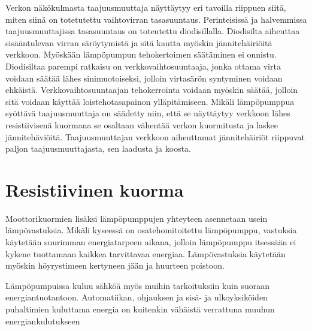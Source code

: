   Verkon näkökulmasta taajuusmuuttaja näyttäytyy eri tavoilla riippuen siitä, miten siinä on totetutettu vaihtovirran tasasuuntaus. Perinteisissä ja halvemmissa taajuusmuuttajissa tasasuuntaus on toteutettu diodisillalla. Diodisilta aiheuttaa sisääntulevan virran säröytymistä ja sitä kautta myöskin jännitehäiriöitä verkkoon. Myöskään lämpöpumpun tehokertoimen säätäminen ei onnistu. Diodisiltaa parempi ratkaisu on verkkovaihtosuuntaaja, jonka ottama virta voidaan säätää lähes sinimuotoiseksi, jolloin virtasärön syntyminen voidaan ehkäistä. Verkkovaihtosuuntaajan tehokerrointa voidaan myöskin säätää, jolloin sitä voidaan käyttää loistehotasapainon ylläpitämiseen. Mikäli lämpöpumppua syöttävä taajuusmuuttaja on säädetty niin, että se näyttäytyy verkkoon lähes resistiivisenä kuormana se osaltaan vähentää verkon kuormitusta ja laskee jännitehäviöitä. Taajuusmuuttajan verkkoon aiheuttamat jännitehäiriöt riippuvat paljon taajuusmuuttajasta, sen laadusta ja koosta. \parencite{koskenjoki}

\section{Resistiivinen kuorma}
  Moottorikuormien lisäksi lämpöpumppujen yhteyteen asennetaan usein lämpövastuksia. Mikäli kyseessä on osatehomitoitettu lämpöpumppu, vastuksia käytetään suurimman energiatarpeen aikana, jolloin lämpöpumppu itsessään ei kykene tuottamaan kaikkea tarvittavaa energiaa. Lämpövastuksia käytetään myöskin höyrystimeen kertyneen jään ja huurteen poistoon.

  Lämpöpumpuissa kuluu sähköä myös muihin tarkoituksiin kuin suoraan energiantuotantoon. Automatiikan, ohjauksen ja sisä- ja ulkoyksiköiden puhaltimien kuluttama energia on kuitenkin vähäistä verrattuna muuhun energiankulutukseen
